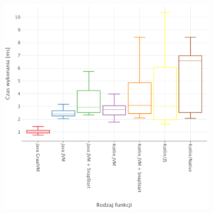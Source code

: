 \begin{figure}[h]
    \begin{minipage}[t]{0.48\textwidth}
        \centering
        \includegraphics[width=\linewidth]{charts/results/warm-start-boxplot-1024.png}
        \label{fig:warm_start_1024} %
    \end{minipage}
\end{figure}
